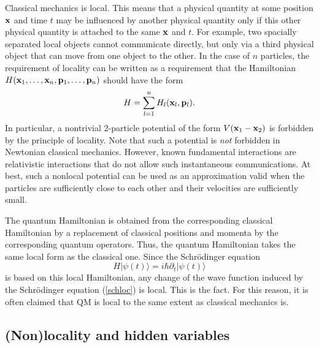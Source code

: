 \documentclass[12pt]{article}
\begin{document}
Classical mechanics is local. This means that a physical quantity 
at some position ${\bf x}$ and time $t$
may be influenced by another physical 
quantity only if this other physical quantity is attached to the 
same ${\bf x}$ and $t$. For example, two spacially separated local objects 
cannot communicate directly, but only via a third physical object 
that can move from one object to the other. In the case of $n$ particles,
the requirement of locality can be written as a requirement 
that the Hamiltonian 
$H({\bf x}_1, \ldots,{\bf x}_n,{\bf p}_1, \ldots,{\bf p}_n)$ 
should have the form
\begin{equation}\label{hcl}
H=\sum_{l=1}^{n} H_l({\bf x}_l,{\bf p}_l) .
\end{equation}
In particular, a nontrivial 2-particle potential of the form 
$V({\bf x}_1-{\bf x}_2)$ is forbidden by the principle of 
locality. Note that such a potential is {\em not} forbidden
in Newtonian classical mechanics. However, known fundamental 
interactions are relativistic interactions that do not allow 
such instantaneous communications.
At best, such a nonlocal potential can be used as an approximation
valid when the particles are sufficiently close to each other
and their velocities are sufficiently small.

The quantum Hamiltonian is obtained from the corresponding classical
Hamiltonian by a replacement of classical positions and momenta 
by the corresponding quantum operators. Thus, the quantum Hamiltonian 
takes the same local form as the classical one.
Since the Schr\"odinger equation 
\begin{equation}\label{schloc}
H|\psi(t)\rangle =i\hbar\partial_t|\psi(t)\rangle 
\end{equation}
is based on this local Hamiltonian, any change of the wave function 
induced by the Schr\"odinger equation (\ref{schloc}) 
is local. This is the fact. For this reason, it is often claimed 
that QM is local to the same extent as classical mechanics is. 

\subsection{(Non)locality and hidden variables}
\end{document}
